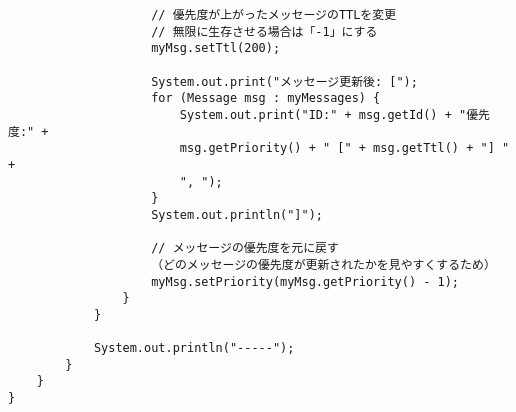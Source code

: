 \documentclass[11pt]{icsthesis}
\begin{document}
\begin{framed}
\begin{verbatim}
                    // 優先度が上がったメッセージのTTLを変更
                    // 無限に生存させる場合は「-1」にする
                    myMsg.setTtl(200);

                    System.out.print("メッセージ更新後: [");
                    for (Message msg : myMessages) {
                        System.out.print("ID:" + msg.getId() + "優先度:" + 
                        msg.getPriority() + " [" + msg.getTtl() + "] " + 
                        ", ");
                    }
                    System.out.println("]");  

                    // メッセージの優先度を元に戻す
                    （どのメッセージの優先度が更新されたかを見やすくするため）  
                    myMsg.setPriority(myMsg.getPriority() - 1);
                }
            }

            System.out.println("-----");
        }
    }
}
\end{verbatim}
\end{framed}
\end{document}

